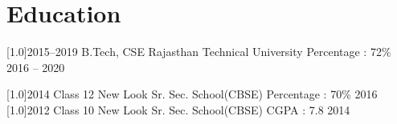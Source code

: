 \documentclass[english]{cv-style}     %
\begin{document}
  
\section{Education}
  \vspace{-0.1cm}
\begin{entrylist}
\entry
{\scalebox{.8}[1.0]{2015--2019}}
{B.Tech, CSE \vspace{0.2cm}}
{\hfill \footnotesize{Rajasthan Technical University}}
{\small{Percentage : 72\%} \hfill \footnotesize{2016 -- 2020} \vspace{0.2cm}}

\entry
{\scalebox{.8}[1.0]{2014}}
{Class 12 \vspace{0.2cm}}
{\hfill \footnotesize{New Look Sr. Sec. School(CBSE)}}
{\small{Percentage : 70\%} \hfill \footnotesize{2016} \vspace{0.2cm}}
\entry
{\scalebox{.8}[1.0]{2012}}
{Class 10 \vspace{0.2cm}}
{\hfill \footnotesize{New Look Sr. Sec. School(CBSE)}}
{\small{CGPA : 7.8} \hfill \footnotesize{2014} \vspace{0.1cm}}
\end{entrylist}
\end{document}
